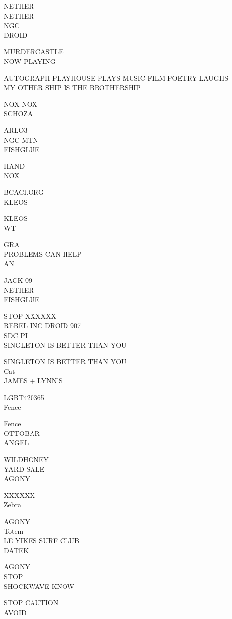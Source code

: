 \documentclass[10pt,letterpaper]{article}
\begin{document}
NETHER\\
NETHER\\
NGC\\
DROID

MURDERCASTLE\\
NOW PLAYING

AUTOGRAPH PLAYHOUSE PLAYS MUSIC FILM POETRY LAUGHS\\
MY OTHER SHIP IS THE BROTHERSHIP

NOX NOX\\
SCHOZA

ARLO3\\
NGC MTN\\
FISHGLUE

HAND\\
NOX

BCACI.ORG\\
KLEOS

KLEOS\\
WT

GRA\\
PROBLEMS CAN HELP\\
AN

JACK 09\\
NETHER\\
FISHGLUE

STOP XXXXXX\\
REBEL INC DROID 907\\
SDC PI\\
SINGLETON IS BETTER THAN YOU

SINGLETON IS BETTER THAN YOU\\
Cat\\
JAMES + LYNN'S

LGBT420365\\
Fence

Fence\\
OTTOBAR\\
ANGEL

WILDHONEY\\
YARD SALE\\
AGONY

XXXXXX\\
Zebra

AGONY\\
Totem\\
LE YIKES SURF CLUB\\
DATEK

AGONY\\
STOP\\
SHOCKWAVE KNOW

STOP CAUTION\\
AVOID
\end{document}
